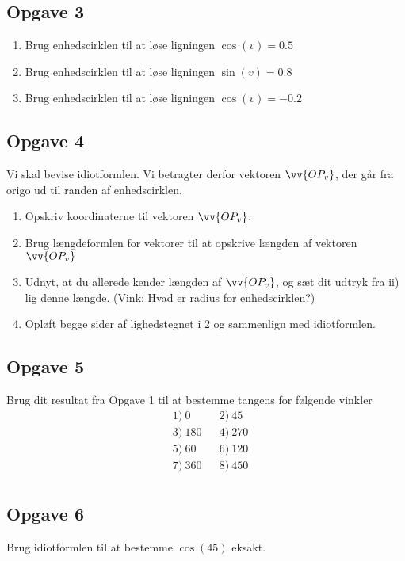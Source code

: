\subsection*{Opgave 3}
\begin{enumerate}[label=\roman*)]
	\item Brug enhedscirklen til at løse ligningen $\cos(v) = 0.5$
	\item Brug enhedscirklen til at løse ligningen $\sin(v) = 0.8$
	\item Brug enhedscirklen til at løse ligningen $\cos(v) = -0.2$
\end{enumerate}

\subsection*{Opgave 4}
Vi skal bevise idiotformlen. Vi betragter derfor vektoren $\vv{OP_v}$, der går fra origo ud til randen af enhedscirklen.
\begin{enumerate}[label=\roman*)]
	\item Opskriv koordinaterne til vektoren $\vv{OP_v}$.
	\item Brug længdeformlen for vektorer til at opskrive længden af vektoren $\vv{OP_v}$
	\item Udnyt, at du allerede kender længden af $\vv{OP_v}$, og sæt dit udtryk fra ii) lig 
	denne længde. (Vink: Hvad er radius for enhedscirklen?)
	\item Opløft begge sider af lighedstegnet i 2 og sammenlign med idiotformlen. 
\end{enumerate}

\subsection*{Opgave 5}
Brug dit resultat fra Opgave 1 til at bestemme tangens for følgende vinkler
\begin{align*}
&1) \ 0  &&2) \ 45   \\
&3) \ 180   &&4) \ 270   \\
&5) \ 60  &&6) \ 120   \\
&7) \ 360  &&8) \ 450   \\
\end{align*}


\subsection*{Opgave 6}
Brug idiotformlen til at bestemme $\cos(45)$ eksakt.

